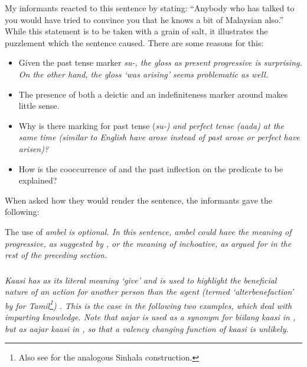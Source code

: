 My informants reacted to this sentence by stating: ``Anybody who has talked to you would have tried to convince you that he knows a bit of Malaysian also.'' While this statement is to be taken with a grain of salt, it illustrates the  puzzlement which the sentence caused. There are some reasons for this:
\begin{itemize}
 \item Given the past tense marker \em su-\em, the gloss as present progressive is surprising. On the other hand, the gloss `was arising' seems problematic as well.
 \item The presence of both a deictic and an indefiniteness marker around  makes little sense.
 \item Why is there marking for past tense (\em su-\em) and perfect tense (\em aada\em) at the same time (similar to English \em have arose \em instead of past \em arose \em or  perfect \em have arisen\em)?
 \item How is the cooccurrence of  and the past inflection on the predicate to be explained?
\end{itemize}

When asked how they would render the sentence, the informants gave the following:


The use of \em ambel \em is optional. In this sentence, \em ambel \em could have the meaning of progressive, as suggested by \citet{SmithEtAl2006cll}, or the meaning of inchoative, as argued for in the rest of the preceding section.


\subsubsection{}\label{sec:wc:kaasi}
\em Kaasi \em has as its literal meaning  `give' and is used to highlight the beneficial nature of an action for another person than the agent (termed `alterbenefaction' by \citet[227]{Lehmann1989} for Tamil\footnote{Also see \citet[93]{Chater1815} for the analogous Sinhala construction.}) . This is the case in the following two examples, which deal with imparting knowledge. Note that \em aajar \em is used as a synonym for \em biilang kaasi \em in , but as \em aajar kaasi \em in , so that a valency changing function of \em kaasi \em is unlikely.

